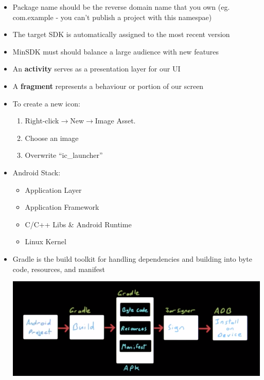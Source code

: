 \begin{itemize}[--]
	\item Package name should be the reverse domain name that you own (eg. com.example - you can't publish a project with this namespae)
	\item The target SDK is automatically assigned to the most recent version
	\item MinSDK must should balance a large audience with new features
	\item An \textbf{activity} serves as a presentation layer for our UI
	\item A \textbf{fragment} represents a behaviour or portion of our screen
	\item To create a new icon:
	\begin{enumerate}
		\item Right-click$\to$New$\to$Image Asset.
		\item Choose an image
		\item Overwrite ``ic\_launcher''
	\end{enumerate}
	
	\item Android Stack:
	\begin{itemize}[--]
		\item Application Layer
		\item Application Framework
		\item C/C++ Libs \& Android Runtime
		\item Linux Kernel
	\end{itemize}

	\item Gradle is the build toolkit for handling dependencies and building into byte code, resources, and manifest
	\begin{center}
		\includegraphics[scale=0.7]{sections/1/gradle_workflow.png}
	\end{center}


\end{itemize}
